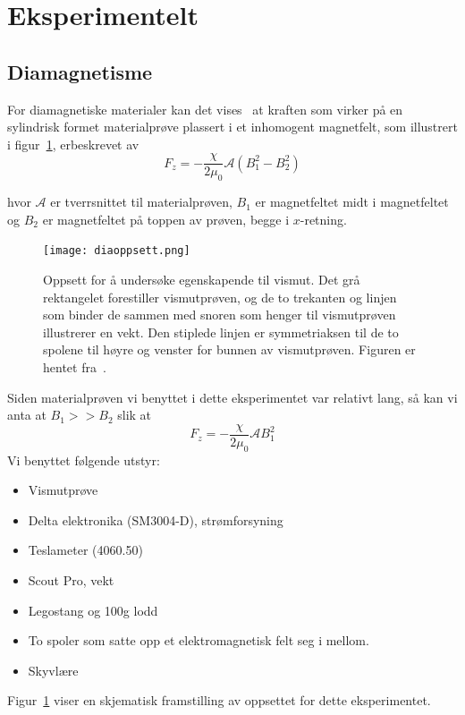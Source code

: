 \documentclass[a4paper,11pt, twocolumn]{article}
\begin{document}
\section{Eksperimentelt}
\subsection{Diamagnetisme}
For diamagnetiske materialer kan det vises~\cite{oppgavesett} at kraften som virker på en sylindrisk formet materialprøve plassert i et inhomogent magnetfelt, som illustrert i figur~\ref{fig:diaoppsett}, erbeskrevet av 
\begin{equation}
	F_z = -\frac{\chi}{2\mu_0}\mathcal{A}(B_1^2-B_2^2)
	\label{eq:dia}
\end{equation}

hvor $\mathcal{A}$ er tverrsnittet til materialprøven, $B_1$ er magnetfeltet midt i magnetfeltet og $B_2$ er magnetfeltet på toppen av prøven, begge i $x$-retning.

\begin{figure}[!ht]
	\centering
	\texttt{[image: diaoppsett.png]}
	\caption{Oppsett for å undersøke egenskapende til vismut. Det grå rektangelet forestiller vismutprøven, og de to trekanten og linjen som binder de sammen med snoren som henger til vismutprøven illustrerer en vekt. Den stiplede linjen er symmetriaksen til de to spolene til høyre og venster for bunnen av vismutprøven. Figuren er hentet fra~\cite{fys1120}.}
	\label{fig:diaoppsett}
\end{figure}
Siden materialprøven vi benyttet i dette eksperimentet var relativt lang, så kan vi anta at $B_1>>B_2$ slik at 
\begin{equation}
	F_z = -\frac{\chi}{2\mu_0}\mathcal{A}B_1^2
	\label{eq:diaForenklet}
\end{equation}
Vi benyttet følgende utstyr:
\begin{itemize}
	\item Vismutprøve
	\item Delta elektronika (SM3004-D), strømforsyning
	\item Teslameter (4060.50)
	\item Scout Pro, vekt
	\item Legostang og 100g lodd 
	\item To spoler som satte opp et elektromagnetisk felt seg i mellom.
	\item Skyvlære
\end{itemize}
Figur~\ref{fig:diaoppsett} viser en skjematisk framstilling av oppsettet for dette eksperimentet.
\end{document}
